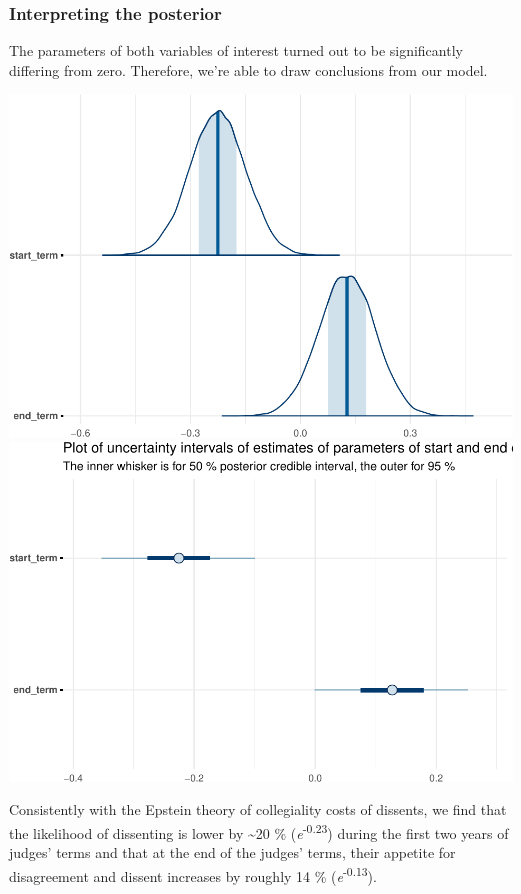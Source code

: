 \documentclass[
  11pt,
]{article}
\begin{document}
\hypertarget{interpreting-the-posterior-1}{%
\subsubsection{Interpreting the
posterior}\label{interpreting-the-posterior-1}}

The parameters of both variables of interest turned out to be
significantly differing from zero. Therefore, we're able to draw
conclusions from our model.

\includegraphics{dissents_article_files/figure-latex/interpreting_posterior_term2-1.pdf}
\includegraphics{dissents_article_files/figure-latex/interpreting_posterior_term2-2.pdf}

Consistently with the Epstein theory of collegiality costs of dissents,
we find that the likelihood of dissenting is lower by \textasciitilde20
\% (\emph{e}\textsuperscript{-0.23}) during the first two years of
judges' terms and that at the end of the judges' terms, their appetite
for disagreement and dissent increases by roughly 14 \%
(\emph{e}\textsuperscript{-0.13}).
\end{document}

